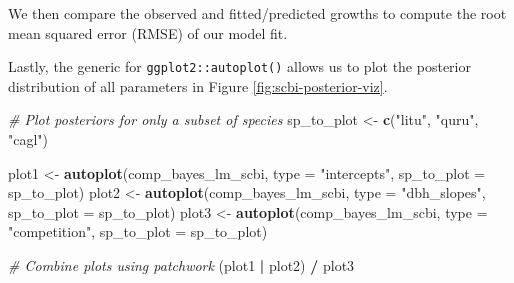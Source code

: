 \documentclass[12pt]{article}
\newenvironment{Shaded}{\begin{snugshade}}{\end{snugshade}}
\newcommand{\CommentTok}[1]{\textcolor[rgb]{0.56,0.35,0.01}{\textit{#1}}}
\newcommand{\DataTypeTok}[1]{\textcolor[rgb]{0.13,0.29,0.53}{#1}}
\newcommand{\KeywordTok}[1]{\textcolor[rgb]{0.13,0.29,0.53}{\textbf{#1}}}
\newcommand{\NormalTok}[1]{#1}
\newcommand{\OperatorTok}[1]{\textcolor[rgb]{0.81,0.36,0.00}{\textbf{#1}}}
\newcommand{\StringTok}[1]{\textcolor[rgb]{0.31,0.60,0.02}{#1}}
\begin{document}
\begin{Shaded}
\end{Shaded}

We then compare the observed and fitted/predicted growths to compute the
root mean squared error (RMSE) of our model fit.

\begin{Shaded}
\end{Shaded}

Lastly, the generic for \texttt{ggplot2::autoplot()} allows us to plot
the posterior distribution of all parameters in Figure
\ref{fig:scbi-posterior-viz}.

\begin{Shaded}
\begin{Highlighting}[]
\CommentTok{# Plot posteriors for only a subset of species}
\NormalTok{sp_to_plot <-}\StringTok{ }\KeywordTok{c}\NormalTok{(}\StringTok{"litu"}\NormalTok{, }\StringTok{"quru"}\NormalTok{, }\StringTok{"cagl"}\NormalTok{)}

\NormalTok{plot1 <-}\StringTok{ }\KeywordTok{autoplot}\NormalTok{(comp_bayes_lm_scbi, }\DataTypeTok{type =} \StringTok{"intercepts"}\NormalTok{, }
                  \DataTypeTok{sp_to_plot =}\NormalTok{ sp_to_plot)}
\NormalTok{plot2 <-}\StringTok{ }\KeywordTok{autoplot}\NormalTok{(comp_bayes_lm_scbi, }\DataTypeTok{type =} \StringTok{"dbh_slopes"}\NormalTok{, }
                  \DataTypeTok{sp_to_plot =}\NormalTok{ sp_to_plot)}
\NormalTok{plot3 <-}\StringTok{ }\KeywordTok{autoplot}\NormalTok{(comp_bayes_lm_scbi, }\DataTypeTok{type =} \StringTok{"competition"}\NormalTok{, }
                  \DataTypeTok{sp_to_plot =}\NormalTok{ sp_to_plot)}

\CommentTok{# Combine plots using patchwork}
\NormalTok{(plot1 }\OperatorTok{|}\StringTok{ }\NormalTok{plot2) }\OperatorTok{/}\StringTok{ }\NormalTok{plot3}
\end{Highlighting}
\end{Shaded}
\end{document}
